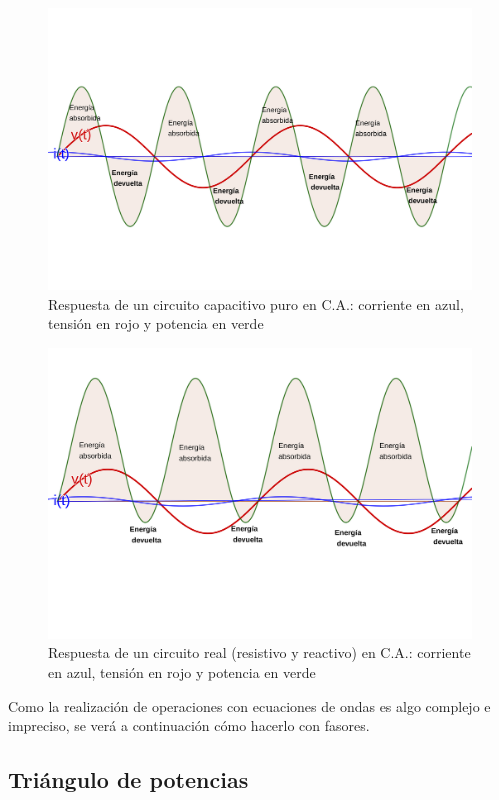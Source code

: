 \begin{figure}[htbp]
  \includegraphics[scale=0.1]{images/potencia_alterna_capacitiva}
  \caption{Respuesta de un circuito capacitivo puro en C.A.: corriente en azul, tensión en rojo y potencia en verde}
  \label{fig:potencia_alterna_capacitiva}
\end{figure}

\begin{figure}[htbp]
  \includegraphics[scale=0.1]{images/potencia_alterna_mixta}
  \caption{Respuesta de un circuito real (resistivo y reactivo) en C.A.: corriente en azul, tensión en rojo y potencia en verde}
  \label{fig:potencia_alterna_mixta}
\end{figure}
Como la realización de operaciones con ecuaciones de ondas es algo complejo e impreciso, se verá a continuación cómo hacerlo con fasores.

\subsection{Triángulo de potencias}


